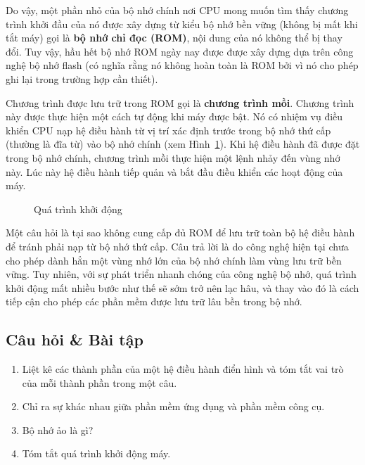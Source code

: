 Do vậy, một phần nhỏ của bộ nhớ chính nơi CPU mong muốn tìm thấy chương trình khởi đầu của
nó được xây dựng từ kiểu bộ nhớ bền vững (không bị mất khi tắt máy) gọi là \textbf{bộ nhớ
  chỉ đọc (ROM)}, nội dung của nó không thể bị thay đổi. Tuy vậy, hầu hết bộ nhớ ROM ngày
nay được được xây dựng dựa trên công nghệ bộ nhớ flash (có nghĩa rằng nó không hoàn toàn
là ROM bởi vì nó cho phép ghi lại trong trường hợp cần thiết).



Chương trình được lưu trữ trong ROM gọi là \textbf{chương trình mồi}. Chương trình này
được thực hiện một cách tự động khi máy được bật. Nó có nhiệm vụ điều khiển CPU nạp hệ
điều hành từ vị trí xác định trước trong bộ nhớ thứ cấp (thường là đĩa từ) vào bộ nhớ
chính (xem Hình~\ref{fig:fig3.5}). Khi hệ điều hành đã được đặt trong bộ nhớ chính, chương
trình mồi thực hiện một lệnh nhảy đến vùng nhớ này. Lúc này hệ điều hành tiếp quản và bắt
đầu điều khiển các hoạt động của máy.

\begin{figure}[tb]
  \centering {}
  \caption{Quá trình khởi động}
  \label{fig:fig3.5}
\end{figure}



Một câu hỏi là tại sao không cung cấp đủ ROM để lưu trữ toàn bộ hệ điều hành để tránh phải
nạp từ bộ nhớ thứ cấp. Câu trả lời là do công nghệ hiện tại chưa cho phép dành hẳn một
vùng nhớ lớn của bộ nhớ chính làm vùng lưu trữ bền vững. Tuy nhiên, với sự phát triển
nhanh chóng của công nghệ bộ nhớ, quá trình khởi động mất nhiều bước như thế sẽ sớm trở
nên lạc hâu, và thay vào đó là cách tiếp cận cho phép các phần mềm được lưu trữ lâu bền
trong bộ nhớ.

\subsection*{Câu hỏi \& Bài tập}
\begin{enumerate}
\item Liệt kê các thành phần của một hệ điều hành điển hình và tóm tắt vai trò của mỗi
  thành phần trong một câu.

\item Chỉ ra sự khác nhau giữa phần mềm ứng dụng và phần mềm công cụ.

\item Bộ nhớ ảo là gì?

\item Tóm tắt quá trình khởi động máy.
\end{enumerate}

